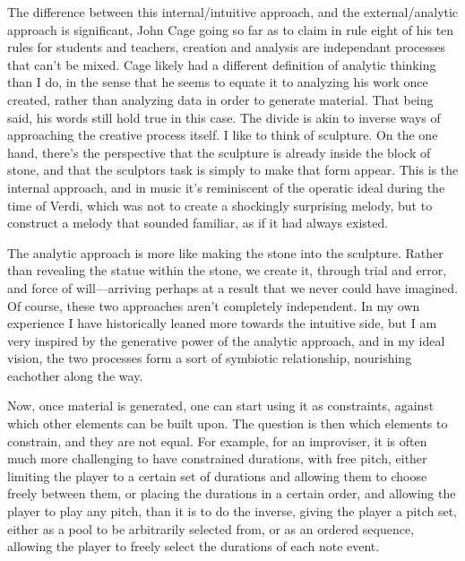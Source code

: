 \documentclass[12pt,twoside,maitrise]{dms_ks}
\theoremstyle{definition}
\begin{document}
The difference between this internal/intuitive approach, and the external/analytic approach is significant, John Cage going so far as to claim in rule eight of his ten rules for students and teachers, creation and analysis are independant processes that can’t be mixed.
Cage likely had a different definition of analytic thinking than I do, in the sense that he seems to equate it to analyzing his work once created, rather than analyzing data in order to generate material.
That being said, his words still hold true in this case.
The divide is akin to inverse ways of approaching the creative process itself.
I like to think of sculpture.
On the one hand, there’s the perspective that the sculpture is already inside the block of stone, and that the sculptors task is simply to make that form appear.
This is the internal approach, and in music it’s reminiscent of the operatic ideal during the time of Verdi, which was not to create a shockingly surprising melody, but to construct a melody that sounded familiar, as if it had always existed.

The analytic approach is more like making the stone into the sculpture.
Rather than revealing the statue within the stone, we create it, through trial and error, and force of will—arriving perhaps at a result that we never could have imagined.
Of course, these two approaches aren’t completely independent.
In my own experience I have historically leaned more towards the intuitive side, but I am very inspired by the generative power of the analytic approach, and in my ideal vision, the two processes form a sort of symbiotic relationship, nourishing eachother along the way.

Now, once material is generated, one can start using it as constraints, against which other elements can be built upon.
The question is then which elements to constrain, and they are not equal.
For example, for an improviser, it is often much more challenging to have constrained durations, with free pitch, either limiting the player to a certain set of durations and allowing them to choose freely between them, or placing the durations in a certain order, and allowing the player to play any pitch, than it is to do the inverse, giving the player a pitch set, either as a pool to be arbitrarily selected from, or as an ordered sequence, allowing the player to freely select the durations of each note event.
\end{document}

